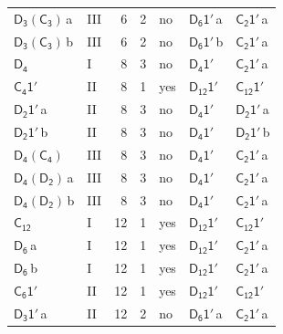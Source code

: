 \documentclass[10pt,a4paper]{article}
\numberwithin{equation}{section}
\newcommand{\grp}[1]{\mathsf{#1}}
\newcommand{\clsletter}[1]{\,{\scriptsize\color{black!55}#1}}
\begin{document}
{\begin{longtable}{@{}llrrlll@{}}
\href{D3-C3.pdf}{$\grp{D_{3}}(\grp{C_{3}})$}\clsletter{a} & III & 6 & 2 & no & \href{D6-1p.pdf}{$\grp{D_{6}1'}$}\clsletter{a} & \href{C2-1p.pdf}{$\grp{C_{2}1'}$}\clsletter{a}\\
\href{D3-C3.pdf}{$\grp{D_{3}}(\grp{C_{3}})$}\clsletter{b} & III & 6 & 2 & no & \href{D6-1p.pdf}{$\grp{D_{6}1'}$}\clsletter{b} & \href{C2-1p.pdf}{$\grp{C_{2}1'}$}\clsletter{a}\\
\href{../../../rotation/data/pdf/D4.pdf}{$\grp{D_{4}}$} & I & 8 & 3 & no & \href{D4-1p.pdf}{$\grp{D_{4}1'}$} & \href{C2-1p.pdf}{$\grp{C_{2}1'}$}\clsletter{a}\\
\href{C4-1p.pdf}{$\grp{C_{4}1'}$} & II & 8 & 1 & yes & \href{D12-1p.pdf}{$\grp{D_{12}1'}$} & \href{C12-1p.pdf}{$\grp{C_{12}1'}$}\\
\href{D2-1p.pdf}{$\grp{D_{2}1'}$}\clsletter{a} & II & 8 & 3 & no & \href{D4-1p.pdf}{$\grp{D_{4}1'}$} & \href{D2-1p.pdf}{$\grp{D_{2}1'}$}\clsletter{a}\\
\href{D2-1p.pdf}{$\grp{D_{2}1'}$}\clsletter{b} & II & 8 & 3 & no & \href{D4-1p.pdf}{$\grp{D_{4}1'}$} & \href{D2-1p.pdf}{$\grp{D_{2}1'}$}\clsletter{b}\\
\href{D4-C4.pdf}{$\grp{D_{4}}(\grp{C_{4}})$} & III & 8 & 3 & no & \href{D4-1p.pdf}{$\grp{D_{4}1'}$} & \href{C2-1p.pdf}{$\grp{C_{2}1'}$}\clsletter{a}\\
\href{D4-D2.pdf}{$\grp{D_{4}}(\grp{D_{2}})$}\clsletter{a} & III & 8 & 3 & no & \href{D4-1p.pdf}{$\grp{D_{4}1'}$} & \href{C2-1p.pdf}{$\grp{C_{2}1'}$}\clsletter{a}\\
\href{D4-D2.pdf}{$\grp{D_{4}}(\grp{D_{2}})$}\clsletter{b} & III & 8 & 3 & no & \href{D4-1p.pdf}{$\grp{D_{4}1'}$} & \href{C2-1p.pdf}{$\grp{C_{2}1'}$}\clsletter{a}\\
\href{../../../rotation/data/pdf/C12.pdf}{$\grp{C_{12}}$} & I & 12 & 1 & yes & \href{D12-1p.pdf}{$\grp{D_{12}1'}$} & \href{C12-1p.pdf}{$\grp{C_{12}1'}$}\\
\href{../../../rotation/data/pdf/D6.pdf}{$\grp{D_{6}}$}\clsletter{a} & I & 12 & 1 & yes & \href{D12-1p.pdf}{$\grp{D_{12}1'}$} & \href{C2-1p.pdf}{$\grp{C_{2}1'}$}\clsletter{a}\\
\href{../../../rotation/data/pdf/D6.pdf}{$\grp{D_{6}}$}\clsletter{b} & I & 12 & 1 & yes & \href{D12-1p.pdf}{$\grp{D_{12}1'}$} & \href{C2-1p.pdf}{$\grp{C_{2}1'}$}\clsletter{a}\\
\href{C6-1p.pdf}{$\grp{C_{6}1'}$} & II & 12 & 1 & yes & \href{D12-1p.pdf}{$\grp{D_{12}1'}$} & \href{C12-1p.pdf}{$\grp{C_{12}1'}$}\\
\href{D3-1p.pdf}{$\grp{D_{3}1'}$}\clsletter{a} & II & 12 & 2 & no & \href{D6-1p.pdf}{$\grp{D_{6}1'}$}\clsletter{a} & \href{C2-1p.pdf}{$\grp{C_{2}1'}$}\clsletter{a}\\

\end{longtable}}
\end{document}
